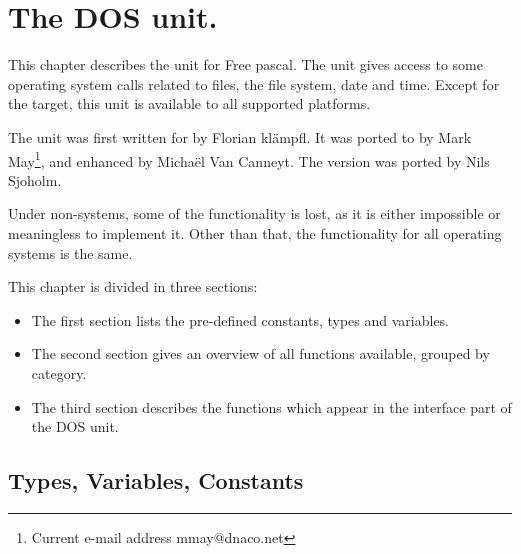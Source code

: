 %
%
%
%
%
\chapter{The DOS unit.}

This chapter describes the  unit for Free pascal. The 
unit gives access to some operating system calls related to files, the
file system, date and time. Except for the \palmos target, this unit is
available to all supported platforms.

The unit was first written for \dos by Florian kl\"ampfl. It was ported to 
\linux by Mark May\footnote{Current e-mail address \textsf{mmay@dnaco.net}}, 
and enhanced by Micha\"el Van Canneyt. The \amiga version was ported by
Nils Sjoholm.

Under non-\dos systems, some of the functionality is lost, as it is either impossible 
or meaningless to implement it. Other than that, the functionality for all 
operating systems is the same.

This chapter is divided in three sections:
\begin{itemize}
\item The first section lists the pre-defined constants, types and variables. 
\item The second section gives an overview of all functions available,
grouped by category.
\item The third section describes the functions which appear in the
interface part of the DOS unit.
\end{itemize}

\section{Types, Variables, Constants}


